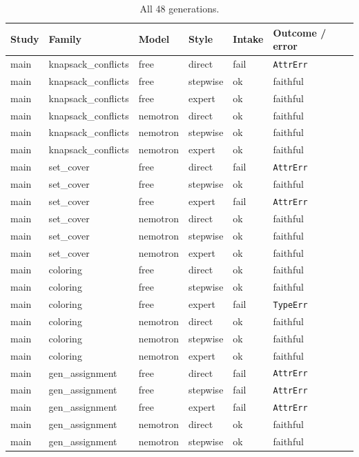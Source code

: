 \documentclass[pdflatex,sn-mathphys-num]{sn-jnl}
\theoremstyle{thmstyleone}
\theoremstyle{thmstyletwo}
\begin{document}
\begin{appendices}
\begin{table}[h]
\caption{All 48 generations.}\label{tab:genrecord}
\footnotesize
\begin{tabular}{llllll}
\toprule
Study & Family & Model & Style & Intake & Outcome / error\\
\midrule
main & knapsack\_conflicts & free & direct & fail & \texttt{AttrErr}\\
main & knapsack\_conflicts & free & stepwise & ok & faithful\\
main & knapsack\_conflicts & free & expert & ok & faithful\\
main & knapsack\_conflicts & nemotron & direct & ok & faithful\\
main & knapsack\_conflicts & nemotron & stepwise & ok & faithful\\
main & knapsack\_conflicts & nemotron & expert & ok & faithful\\
main & set\_cover & free & direct & fail & \texttt{AttrErr}\\
main & set\_cover & free & stepwise & ok & faithful\\
main & set\_cover & free & expert & fail & \texttt{AttrErr}\\
main & set\_cover & nemotron & direct & ok & faithful\\
main & set\_cover & nemotron & stepwise & ok & faithful\\
main & set\_cover & nemotron & expert & ok & faithful\\
main & coloring & free & direct & ok & faithful\\
main & coloring & free & stepwise & ok & faithful\\
main & coloring & free & expert & fail & \texttt{TypeErr}\\
main & coloring & nemotron & direct & ok & faithful\\
main & coloring & nemotron & stepwise & ok & faithful\\
main & coloring & nemotron & expert & ok & faithful\\
main & gen\_assignment & free & direct & fail & \texttt{AttrErr}\\
main & gen\_assignment & free & stepwise & fail & \texttt{AttrErr}\\
main & gen\_assignment & free & expert & fail & \texttt{AttrErr}\\
main & gen\_assignment & nemotron & direct & ok & faithful\\
main & gen\_assignment & nemotron & stepwise & ok & faithful\\

\end{tabular}
\end{table}
\end{appendices}
\end{document}
